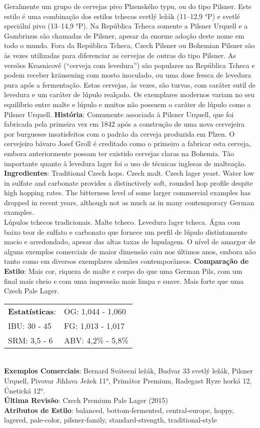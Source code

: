 Geralmente um grupo de cervejas pivo Plzenského typu, ou do tipo Pilsner. Este estilo é uma combinação dos estilos tchecos svetlý ležák (11–12,9 °P) e svetlé speciální pivo (13–14,9 °P). Na República Tcheca somente a Pilsner Urquell e a Gambrinus são chamadas de Pilsner, apesar da enorme adoção deste nome em todo o mundo. Fora da República Tcheca, Czech Pilsner ou Bohemian Pilsner são às vezes utilizadas para diferenciar as cervejas de outras do tipo Pilsner. As versões Kvasnicové (“cerveja com levedura”) são populares na República Tcheca e podem receber kräusening com mosto inoculado, ou uma dose fresca de levedura pura após a fermentação. Estas cervejas, às vezes, são turvas, com caráter sutil de levedura e um caráter de lúpulo realçado. Os exemplares modernos variam no seu equilíbrio entre malte e lúpulo e muitos não possuem o caráter de lúpulo como a Pilsner Urquell.
\textbf{História}: Comumente associada à Pilsner Urquell, que foi fabricada pela primeira vez em 1842 após a construção de uma nova cervejeira por burgueses insatisfeitos com o padrão da cerveja produzida em Plzen. O cervejeiro bávaro Josef Groll é creditado como o primeiro a fabricar esta cerveja, embora anteriormente possam ter existido cervejas claras na Bohemia. Tão importante quanto à levedura lager foi o uso de técnicas inglesas de malteação. \\
\textbf{Ingredientes}: Traditional Czech hops. Czech malt. Czech lager yeast. Water low in sulfate and carbonate provides a distinctively soft, rounded hop profile despite high hopping rates. The bitterness level of some larger commercial examples has dropped in recent years, although not as much as in many contemporary German examples. \\
Lúpulos tchecos tradicionais. Malte tcheco. Levedura lager tcheca. Água com baixo teor de sulfato e carbonato que fornece um perfil de lúpulo distintamente macio e arredondado, apesar das altas taxas de lupulagem. O nível de amargor de alguns exemplos comerciais de maior dimensão caiu nos últimos anos, embora não tanto como em diversos exemplares alemães contemporâneos.
\textbf{Comparação de Estilo}: Mais cor, riqueza de malte e corpo do que uma German Pils, com um final mais cheio e com uma impressão mais limpa e suave. Mais forte que uma Czech Pale Lager. \\
\begin{tabular}{@{}p{35mm}p{35mm}@{}}
  \textbf{Estatísticas}: & OG: 1,044 - 1,060 \\
  IBU: 30 - 45  & FG: 1,013 - 1,017  \\
  SRM: 3,5 - 6  & ABV: 4,2\% - 5,8\%
\end{tabular}\\
\textbf{Exemplos Comerciais}: Bernard Svátecní ležák, Budvar 33 svetlý ležák, Pilsner Urquell, Pivovar Jihlava Ježek 11°, Primátor Premium, Radegast Ryze horká 12, Únetická 12°. \\
\textbf{Última Revisão}: Czech Premium Pale Lager (2015) \\
\textbf{Atributos de Estilo}: balanced, bottom-fermented, central-europe, hoppy, lagered, pale-color, pilsner-family, standard-strength, traditional-style